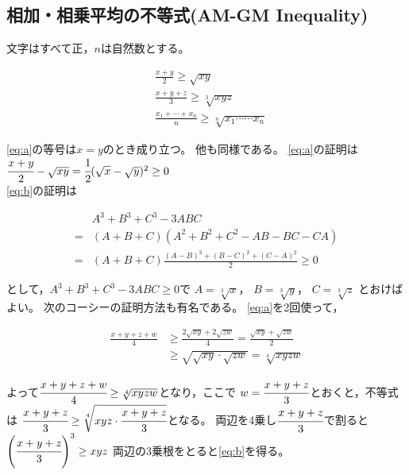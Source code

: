 \documentclass[autodetect-engine,ja=standard, 10.5pt, a4paper, titlepage]{bxjsarticle}
\numberwithin{equation}{section} %
\begin{document}
\subsection{相加・相乗平均の不等式(AM-GM Inequality)}
文字はすべて正，$n$は自然数とする。\\
\begin{fleqn}[20pt]
  \begin{align*}
    &\frac{x+y}{2} \geq \sqrt{xy} \tag*{(A)}\label{eq:a}\\
    &\frac{x+y+z}{3} \geq \sqrt[3]{xyz} \tag*{(B)}\label{eq:b}\\
    &\frac{x_{1}+ \cdots +x_{n}}{n} \geq \sqrt[n]{x_{1}\cdots\cdots x_{n}} \label{eq:n}
  \end{align*}
\end{fleqn}
\ref*{eq:a}の等号は$x=y$のとき成り立つ。
他も同様である。
\ref*{eq:a}の証明は$\cfrac{x+y}{2} - \sqrt{xy} = \cfrac{1}{2}(\sqrt{x}-\sqrt{y})^2 \geq 0$\\
\ref*{eq:b}の証明は
\begin{fleqn}[20pt]
  \begin{align*}
    &A^3+B^3+C^3-3ABC\\
    =&(A+B+C)(A^2+B^2+C^2-AB-BC-CA)\\
    =&(A+B+C)\frac{(A-B)^2 + (B-C)^2 + (C-A)^2}{2}\geq 0
  \end{align*}
\end{fleqn}
として，$A^3+B^3+C^3-3ABC\geq 0$で
$A=\sqrt[3]{x}$，
$B=\sqrt[3]{y}$，
$C=\sqrt[3]{z}$
とおけばよい。
次のコーシーの証明方法も有名である。
\ref*{eq:a}を2回使って，
\begin{fleqn}[20pt]
  \begin{align*}
    \frac{x+y+z+w}{4}
    &\geq \frac{2\sqrt{xy}+2\sqrt{zw}}{4} = \frac{\sqrt{xy}+\sqrt{zw}}{2}\\
    &\geq \sqrt{\sqrt{xy}\cdot \sqrt{zw}}=\sqrt[4]{xyzw}
  \end{align*}
\end{fleqn}
よって$\cfrac{x+y+z+w}{4}\geq \sqrt[4]{xyzw}$となり，ここで
$w=\cfrac{x+y+z}{3}$とおくと，不等式は
$\cfrac{x+y+z}{3}\geq \sqrt[4]{xyz\cdot \cfrac{x+y+z}{3}}$となる。
両辺を4乗し$\cfrac{x+y+z}{3}$で割ると
$\left(\cfrac{x+y+z}{3}\right)^3\geq xyz$
両辺の3乗根をとると\ref*{eq:b}を得る。
\end{document}
